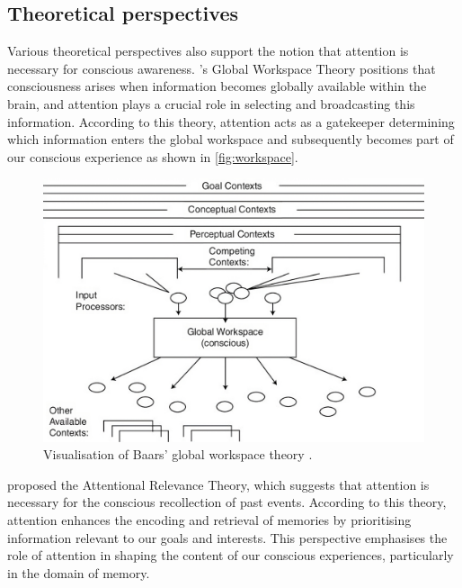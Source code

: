 \documentclass[10pt]{article}
\begin{document}
\begin{sloppypar}
  \subsection{Theoretical perspectives}
  \label{sec:theoretical}

  Various theoretical perspectives also support the notion that attention is necessary for conscious awareness. \cite{baars_essential_1997} ’s Global Workspace Theory positions that consciousness arises when information becomes globally available within the brain, and attention plays a crucial role in selecting and broadcasting this information. According to this theory, attention acts as a gatekeeper determining which information enters the global workspace and subsequently becomes part of our conscious experience as shown in \autoref{fig:workspace}.

  \begin{figure}[ht]
    \centering
    \includegraphics[width=\textwidth]{figures/global-workspace.jpeg}
    \caption[Visualisation of Baars' global workspace theory.]{Visualisation of Baars' global workspace theory \citep{sun_computational_2007}.}
    \label{fig:workspace}
  \end{figure}

  \cite{de_brigard_role_2012} proposed the Attentional Relevance Theory, which suggests that attention is necessary for the conscious recollection of past events. According to this theory, attention enhances the encoding and retrieval of memories by prioritising information relevant to our goals and interests. This perspective emphasises the role of attention in shaping the content of our conscious experiences, particularly in the domain of memory.


\end{sloppypar}
\end{document}
